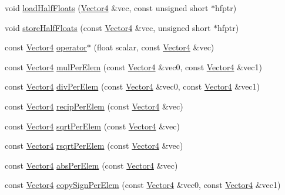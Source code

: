 \begin{DoxyCompactItemize}
void \hyperlink{namespaceVectormath_1_1Aos_a24395d9fc783db1fea9392599e63259e}{load\-Half\-Floats} (\hyperlink{classVectormath_1_1Aos_1_1Vector4}{Vector4} \&vec, const unsigned short $\ast$hfptr)
\item 
void \hyperlink{namespaceVectormath_1_1Aos_a8c9fa59aa559bf2b71c0a63b87e6f713}{store\-Half\-Floats} (const \hyperlink{classVectormath_1_1Aos_1_1Vector4}{Vector4} \&vec, unsigned short $\ast$hfptr)
\item 
const \hyperlink{classVectormath_1_1Aos_1_1Vector4}{Vector4} \hyperlink{namespaceVectormath_1_1Aos_a423ad711062509f462f270d096d9a4e7}{operator$\ast$} (float scalar, const \hyperlink{classVectormath_1_1Aos_1_1Vector4}{Vector4} \&vec)
\item 
const \hyperlink{classVectormath_1_1Aos_1_1Vector4}{Vector4} \hyperlink{namespaceVectormath_1_1Aos_ab346319638d615a62188a7ad661741fa}{mul\-Per\-Elem} (const \hyperlink{classVectormath_1_1Aos_1_1Vector4}{Vector4} \&vec0, const \hyperlink{classVectormath_1_1Aos_1_1Vector4}{Vector4} \&vec1)
\item 
const \hyperlink{classVectormath_1_1Aos_1_1Vector4}{Vector4} \hyperlink{namespaceVectormath_1_1Aos_af0feb5ad8e7af064645552e2ce52780c}{div\-Per\-Elem} (const \hyperlink{classVectormath_1_1Aos_1_1Vector4}{Vector4} \&vec0, const \hyperlink{classVectormath_1_1Aos_1_1Vector4}{Vector4} \&vec1)
\item 
const \hyperlink{classVectormath_1_1Aos_1_1Vector4}{Vector4} \hyperlink{namespaceVectormath_1_1Aos_a6eba03edf9ef6eb268e5c4fe25570fae}{recip\-Per\-Elem} (const \hyperlink{classVectormath_1_1Aos_1_1Vector4}{Vector4} \&vec)
\item 
const \hyperlink{classVectormath_1_1Aos_1_1Vector4}{Vector4} \hyperlink{namespaceVectormath_1_1Aos_a59b863b0a0c1cdf106aee5c5b1d6e35c}{sqrt\-Per\-Elem} (const \hyperlink{classVectormath_1_1Aos_1_1Vector4}{Vector4} \&vec)
\item 
const \hyperlink{classVectormath_1_1Aos_1_1Vector4}{Vector4} \hyperlink{namespaceVectormath_1_1Aos_aa824e9d6490b7d1701385809f90f2395}{rsqrt\-Per\-Elem} (const \hyperlink{classVectormath_1_1Aos_1_1Vector4}{Vector4} \&vec)
\item 
const \hyperlink{classVectormath_1_1Aos_1_1Vector4}{Vector4} \hyperlink{namespaceVectormath_1_1Aos_a5d66bd5361683a944a5e5efa2777a181}{abs\-Per\-Elem} (const \hyperlink{classVectormath_1_1Aos_1_1Vector4}{Vector4} \&vec)
\item 
const \hyperlink{classVectormath_1_1Aos_1_1Vector4}{Vector4} \hyperlink{namespaceVectormath_1_1Aos_a0087d84862e7a68349a3ef4d9d74341a}{copy\-Sign\-Per\-Elem} (const \hyperlink{classVectormath_1_1Aos_1_1Vector4}{Vector4} \&vec0, const \hyperlink{classVectormath_1_1Aos_1_1Vector4}{Vector4} \&vec1)

\end{DoxyCompactItemize}
